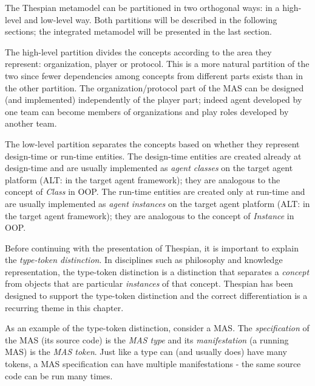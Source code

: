 The Thespian metamodel can be partitioned in two orthogonal ways: in a high-level and low-level way.
Both partitions will be described in the following sections; the integrated metamodel will be presented in the last section.

The high-level partition divides the concepts according to the area they represent: organization, player or protocol.
This is a more natural partition of the two since fewer dependencies among concepts from different parts exists than in the other partition.
The organization/protocol part of the MAS can be designed (and implemented) independently of the player part; indeed agent developed by one team can become members of organizations and play roles developed by another team. 

The low-level partition separates the concepts based on whether they represent design-time or run-time entities.
The design-time entities are created already at design-time and are usually implemented as \textit{agent classes} on the target agent platform (ALT: in the target agent framework); they are analogous to the concept of \textit{Class} in OOP.
The run-time entities are created only at run-time and are usually implemented as \textit{agent instances} on the target agent platform (ALT: in the target agent framework); they are analogous to the concept of \textit{Instance} in OOP.

Before continuing with the presentation of Thespian, it is important to explain the \textit{type-token distinction}.
In disciplines such as philosophy and knowledge representation, the type-token distinction is a distinction that separates a \textit{concept} from objects that are particular \textit{instances} of that concept.
Thespian has been designed to support the type-token distinction and the correct differentiation is a recurring theme in this chapter.

As an example of the type-token distinction, consider a MAS.
The \textit{specification} of the MAS (its source code) is the \textit{MAS type} and its \textit{manifestation} (a running MAS) is the \textit{MAS token}.
Just like a type can (and usually does) have many tokens, a MAS specification can have multiple manifestations - the same source code can be run many times.

